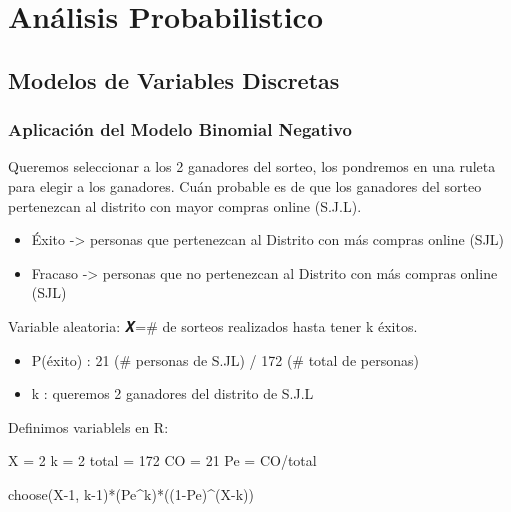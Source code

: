 \documentclass[
]{article}
\newenvironment{Shaded}{\begin{snugshade}}{\end{snugshade}}
\newcommand{\DecValTok}[1]{\textcolor[rgb]{0.00,0.00,0.81}{#1}}
\newcommand{\FunctionTok}[1]{\textcolor[rgb]{0.00,0.00,0.00}{#1}}
\newcommand{\NormalTok}[1]{#1}
\newcommand{\OtherTok}[1]{\textcolor[rgb]{0.56,0.35,0.01}{#1}}
\newcommand{\SpecialCharTok}[1]{\textcolor[rgb]{0.00,0.00,0.00}{#1}}
\providecommand{\tightlist}{%
  \setlength{\itemsep}{0pt}\setlength{\parskip}{0pt}}
\begin{document}
\hypertarget{anuxe1lisis-probabilistico}{%
\section{\texorpdfstring{\textbf{Análisis
Probabilistico}}{Análisis Probabilistico}}\label{anuxe1lisis-probabilistico}}

\hypertarget{modelos-de-variables-discretas}{%
\subsection{\texorpdfstring{\textbf{Modelos de Variables
Discretas}}{Modelos de Variables Discretas}}\label{modelos-de-variables-discretas}}

\hypertarget{aplicaciuxf3n-del-modelo-binomial-negativo}{%
\subsubsection{\texorpdfstring{\textbf{Aplicación del Modelo Binomial
Negativo}}{Aplicación del Modelo Binomial Negativo}}\label{aplicaciuxf3n-del-modelo-binomial-negativo}}

Queremos seleccionar a los 2 ganadores del sorteo, los pondremos en una
ruleta para elegir a los ganadores. Cuán probable es de que los
ganadores del sorteo pertenezcan al distrito con mayor compras online
(S.J.L).

\begin{itemize}
\tightlist
\item
  Éxito -\textgreater{} personas que pertenezcan al Distrito con más
  compras online (SJL)
\item
  Fracaso -\textgreater{} personas que no pertenezcan al Distrito con
  más compras online (SJL)
\end{itemize}

Variable aleatoria: 𝑿=\# de sorteos realizados hasta tener k éxitos.

\begin{itemize}
\tightlist
\item
  P(éxito) : 21 (\# personas de S.JL) / 172 (\# total de personas)
\item
  k : queremos 2 ganadores del distrito de S.J.L
\end{itemize}

Definimos variablels en R:

\begin{Shaded}
\begin{Highlighting}[]
\NormalTok{X }\OtherTok{=} \DecValTok{2}
\NormalTok{k }\OtherTok{=} \DecValTok{2}
\NormalTok{total }\OtherTok{=} \DecValTok{172}
\NormalTok{CO }\OtherTok{=} \DecValTok{21}
\NormalTok{Pe }\OtherTok{=}\NormalTok{ CO}\SpecialCharTok{/}\NormalTok{total}

\FunctionTok{choose}\NormalTok{(X}\DecValTok{{-}1}\NormalTok{, k}\DecValTok{{-}1}\NormalTok{)}\SpecialCharTok{*}\NormalTok{(Pe}\SpecialCharTok{\^{}}\NormalTok{k)}\SpecialCharTok{*}\NormalTok{((}\DecValTok{1}\SpecialCharTok{{-}}\NormalTok{Pe)}\SpecialCharTok{\^{}}\NormalTok{(X}\SpecialCharTok{{-}}\NormalTok{k))}
\end{Highlighting}
\end{Shaded}
\end{document}
